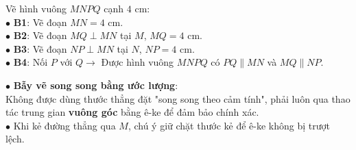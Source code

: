 \documentclass[14pt,a4paper,oneside]{extbook}
\begin{document}
\vspace{2mm}

\noindent
\begin{minipage}[t]{0.53\textwidth}
  \begin{tcolorbox}[
    enhanced,
    title={\footnotesize\bfseries\color{white}\faCheckCircle\ Ví dụ thực hành chuẩn mực},
    colback=green!2!white,
    colframe=green!60!black,
    arc=2.5mm, boxrule=0.8pt, top=1.8mm, bottom=1.8mm, left=2.2mm, right=2.2mm
  ]
    \footnotesize
    Vẽ hình vuông $MNPQ$ cạnh $4\text{ cm}$:\\
    $\bullet$ \textbf{B1}: Vẽ đoạn $MN = 4\text{ cm}$.\\
    $\bullet$ \textbf{B2}: Vẽ đoạn $MQ \perp MN$ tại $M$, $MQ = 4\text{ cm}$.\\
    $\bullet$ \textbf{B3}: Vẽ đoạn $NP \perp MN$ tại $N$, $NP = 4\text{ cm}$.\\
    $\bullet$ \textbf{B4}: Nối $P$ với $Q \rightarrow$ Được hình vuông $MNPQ$ có $PQ \parallel MN$ và $MQ \parallel NP$.
  \end{tcolorbox}
\end{minipage}%
\hfill
\begin{minipage}[t]{0.45\textwidth}
  \begin{tcolorbox}[
    enhanced,
    title={\footnotesize\bfseries\color{white}\faExclamationTriangle\ Mẹo tránh bẫy trắc nghiệm},
    colback=red!2!white,
    colframe=red!70!black,
    arc=2.5mm, boxrule=0.8pt, top=1.8mm, bottom=1.8mm, left=2.2mm, right=2.2mm
  ]
    \footnotesize
    $\bullet$ \textbf{Bẫy vẽ song song bằng ước lượng}:\\
    Không được dùng thước thẳng đặt "song song theo cảm tính", phải luôn qua thao tác trung gian \textbf{vuông góc} bằng ê-ke để đảm bảo chính xác.\\
    $\bullet$ Khi kẻ đường thẳng qua $M$, chú ý giữ chặt thước kẻ để ê-ke không bị trượt lệch.
  \end{tcolorbox}
\end{minipage}
\end{document}
